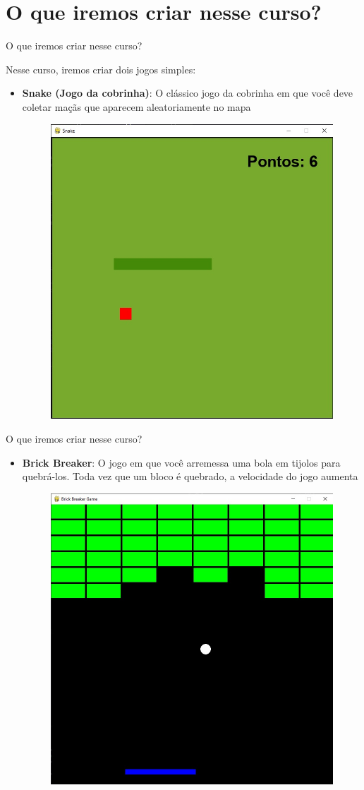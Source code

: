 \documentclass[fleqn,utf8,aspectratio=169,14pt]{beamer}
\begin{document}
	\section{O que iremos criar nesse curso?}
	\begin{frame}{O que iremos criar nesse curso?}
		
		Nesse curso, iremos criar dois jogos simples:
		
		\begin{itemize}
			\item \textbf{Snake (Jogo da cobrinha)}: O clássico jogo da cobrinha em que você deve coletar maçãs que aparecem aleatoriamente no mapa
			\begin{figure}
				\centering
				\includegraphics[width=0.3\linewidth]{"Imagem 6"}
				\label{fig:imagem-6}
			\end{figure}
		\end{itemize}
		
	\end{frame}
	
	\begin{frame}{O que iremos criar nesse curso?}
		
		\begin{itemize}
			\item \textbf{Brick Breaker}: O jogo em que você arremessa uma bola em tijolos para quebrá-los. Toda vez que um bloco é quebrado, a velocidade do jogo aumenta
			\begin{figure}
				\centering
				\includegraphics[width=0.3\linewidth]{"Imagem7"}
				\label{fig:imagem-7}
			\end{figure}
		\end{itemize}
		
	\end{frame}
	
\end{document}
